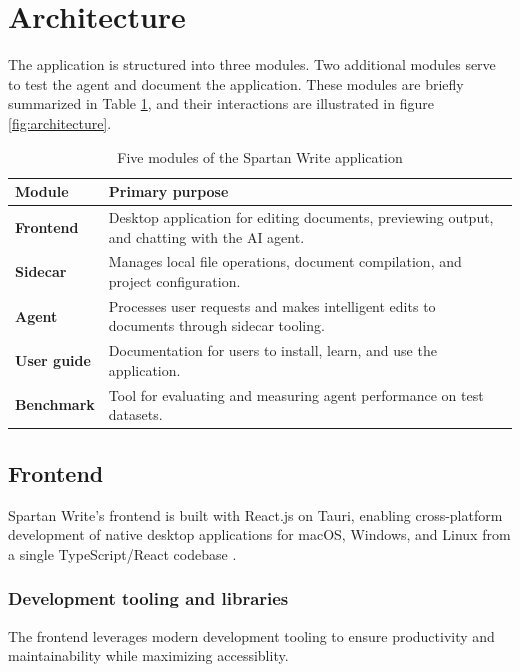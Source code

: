 \section{Architecture}

The application is structured into three modules.
Two additional modules serve to test the agent and document the application.
These modules are briefly summarized in Table \ref{tab:modules}, and their interactions are illustrated in figure \ref{fig:architecture}.

\begin{table}[h]
\centering
\begin{tabular}{|l|p{10cm}|}
\hline
\textbf{Module} & \textbf{Primary purpose} \\
\hline
\textbf{Frontend} & Desktop application for editing documents, previewing output, and chatting with the AI agent. \\
\hline
\textbf{Sidecar} & Manages local file operations, document compilation, and project configuration. \\
\hline
\textbf{Agent} & Processes user requests and makes intelligent edits to documents through sidecar tooling. \\
\hline
\textbf{User guide} & Documentation for users to install, learn, and use the application. \\
\hline
\textbf{Benchmark} & Tool for evaluating and measuring agent performance on test datasets. \\
\hline
\end{tabular}
\caption{Five modules of the Spartan Write application}
\label{tab:modules}
\end{table}

\subsection{Frontend}

Spartan Write's frontend is built with React.js \cite{react} on Tauri, enabling cross-platform development of native desktop applications for macOS, Windows, and Linux from a single TypeScript/React codebase \cite{tauri}.

\subsubsection{Development tooling and libraries}

The frontend leverages modern development tooling to ensure productivity and maintainability while maximizing accessiblity.

